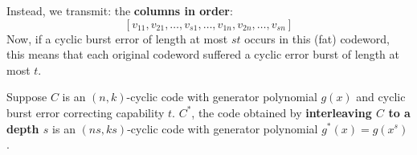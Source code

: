 Instead, we transmit: the \textbf{columns in order}:
\[ \left[ v_{11},v_{21},\ldots ,v_{s1},\ldots ,v_{1n},v_{2n},\ldots ,v_{sn} \right] \]
Now, if a cyclic burst error of length at most $ st $ occurs in this (fat) codeword,
this means that each original codeword suffered a cyclic error burst of length at most $ t $.

\begin{Theorem}{}{}
    Suppose $ C $ is an $ (n,k) $-cyclic code with generator polynomial $ g(x) $
    and cyclic burst error correcting capability $ t $. $ C^* $, the code
    obtained by \textbf{interleaving $C$ to a depth $s$} is an
    $ (ns,ks) $-cyclic code with generator polynomial $ g^*(x)=g(x^s) $.
\end{Theorem}

